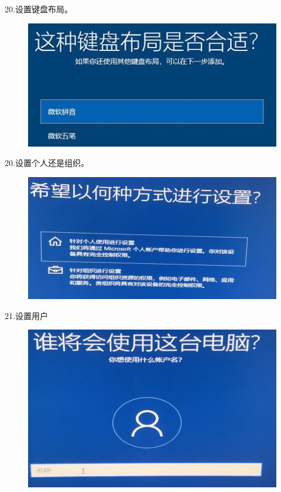 \documentclass[openbib]{article}
\begin{document}
20.设置键盘布局。
\begin{figure}[H]
	\centering
	\includegraphics[scale=0.45]{a}
\end{figure}

20.设置个人还是组织。
\begin{figure}[htbp]
	\centering
	\includegraphics[scale=0.24]{21}
\end{figure}

21.设置用户
\begin{figure}[H]
	\centering
	\includegraphics[scale=0.24]{b}
\end{figure}
\end{document}
